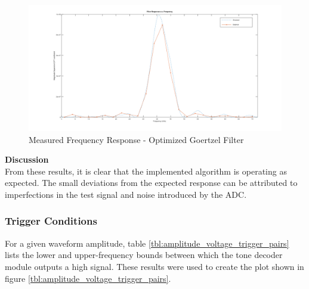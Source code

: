 \begin{figure}[H]
	\centering
	\includegraphics[width=\linewidth]{figures/results/goertzel_filter_empirical_wide.png}
	\caption{Measured Frequency Response - Optimized Goertzel Filter}
	\label{fig:goertzel_filter_response_empirical}
\end{figure}


\textbf{Discussion}\\
From these results, it is clear that the implemented algorithm is operating as expected. The small deviations from the expected response can be attributed to imperfections in the test signal and noise introduced by the ADC.




\subsubsection{Trigger Conditions}

For a given waveform amplitude, table \ref{tbl:amplitude_voltage_trigger_pairs} lists the lower and upper-frequency bounds between which the tone decoder module outputs a high signal. These results were used to create the plot shown in figure \ref{tbl:amplitude_voltage_trigger_pairs}.

